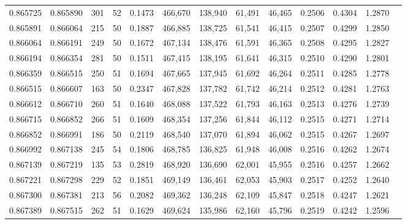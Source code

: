 \begin{tabular}{rrrrrrrrrrrrr}
0.865725 & 0.865890 &   301 &  52 &                                     0.1473 & 466,670 & 138,940 &  61,491 &  46,465 & 0.2506 & 0.4304 & 1.2870 \\
0.865891 & 0.866064 &   215 &  50 &                                     0.1887 & 466,885 & 138,725 &  61,541 &  46,415 & 0.2507 & 0.4299 & 1.2850 \\
0.866064 & 0.866191 &   249 &  50 &                                     0.1672 & 467,134 & 138,476 &  61,591 &  46,365 & 0.2508 & 0.4295 & 1.2827 \\
0.866194 & 0.866354 &   281 &  50 &                                     0.1511 & 467,415 & 138,195 &  61,641 &  46,315 & 0.2510 & 0.4290 & 1.2801 \\
0.866359 & 0.866515 &   250 &  51 &                                     0.1694 & 467,665 & 137,945 &  61,692 &  46,264 & 0.2511 & 0.4285 & 1.2778 \\
0.866515 & 0.866607 &   163 &  50 &                                     0.2347 & 467,828 & 137,782 &  61,742 &  46,214 & 0.2512 & 0.4281 & 1.2763 \\
0.866612 & 0.866710 &   260 &  51 &                                     0.1640 & 468,088 & 137,522 &  61,793 &  46,163 & 0.2513 & 0.4276 & 1.2739 \\
0.866715 & 0.866852 &   266 &  51 &                                     0.1609 & 468,354 & 137,256 &  61,844 &  46,112 & 0.2515 & 0.4271 & 1.2714 \\
0.866852 & 0.866991 &   186 &  50 &                                     0.2119 & 468,540 & 137,070 &  61,894 &  46,062 & 0.2515 & 0.4267 & 1.2697 \\
0.866992 & 0.867138 &   245 &  54 &                                     0.1806 & 468,785 & 136,825 &  61,948 &  46,008 & 0.2516 & 0.4262 & 1.2674 \\
0.867139 & 0.867219 &   135 &  53 &                                     0.2819 & 468,920 & 136,690 &  62,001 &  45,955 & 0.2516 & 0.4257 & 1.2662 \\
0.867221 & 0.867298 &   229 &  52 &                                     0.1851 & 469,149 & 136,461 &  62,053 &  45,903 & 0.2517 & 0.4252 & 1.2640 \\
0.867300 & 0.867381 &   213 &  56 &                                     0.2082 & 469,362 & 136,248 &  62,109 &  45,847 & 0.2518 & 0.4247 & 1.2621 \\
0.867389 & 0.867515 &   262 &  51 &                                     0.1629 & 469,624 & 135,986 &  62,160 &  45,796 & 0.2519 & 0.4242 & 1.2596 \\

\end{tabular}
